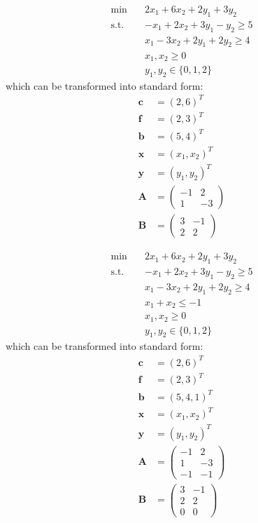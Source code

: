 \documentclass[fleqn,10pt]{wlscirep}
\begin{document}
\begin{align}
	\min \quad & 2 x_{1} + 6 x_{2} + 2 y_{1} + 3 y_{2} \\
    \text{s.t.} \quad & - x_{1} + 2 x_{2} + 3 y_{1} - y_{2} \geq 5 \\ 
    & x_{1} - 3 x_{2} + 2 y_{1} + 2 y_{2} \geq 4 \\
    & x_{1}, x_{2} \geq 0 \\
    & y_{1}, y_{2} \in \{0, 1, 2 \}
\end{align}
which can be transformed into standard form:
\begin{align}
	\mathbf{c} &= (2, 6)^T \\
    \mathbf{f} &= (2, 3)^T \\
    \mathbf{b} &= (5, 4)^T \\
    \mathbf{x} &= (x_1, x_2)^T \\
    \mathbf{y} &= (y_1, y_2)^T \\
    \mathbf{A} &= \left(\begin{array}{c}
    	-1 & 2 \\
        1 & -3
    \end{array} \right) \\
    \mathbf{B} &= \left(\begin{array}{c}
    	3 & -1 \\
        2 & 2
    \end{array} \right)
\end{align}


\begin{align}
	\min \quad & 2 x_{1} + 6 x_{2} + 2 y_{1} + 3 y_{2} \\
    \text{s.t.} \quad & - x_{1} + 2 x_{2} + 3 y_{1} - y_{2} \geq 5 \\ 
    & x_{1} - 3 x_{2} + 2 y_{1} + 2 y_{2} \geq 4 \\
    & x_{1} + x_{2} \leq -1 \\
    & x_{1}, x_{2} \geq 0 \\
    & y_{1}, y_{2} \in \{0, 1, 2 \}
\end{align}
which can be transformed into standard form:
\begin{align}
	\mathbf{c} &= (2, 6)^T \\
    \mathbf{f} &= (2, 3)^T \\
    \mathbf{b} &= (5, 4, 1)^T \\
    \mathbf{x} &= (x_1, x_2)^T \\
    \mathbf{y} &= (y_1, y_2)^T \\
    \mathbf{A} &= \left(\begin{array}{c}
    	-1 & 2 \\
        1 & -3 \\
        -1 & -1
    \end{array} \right) \\
    \mathbf{B} &= \left(\begin{array}{c}
    	3 & -1 \\
        2 & 2 \\
        0 & 0
    \end{array} \right)
\end{align}
\end{document}
